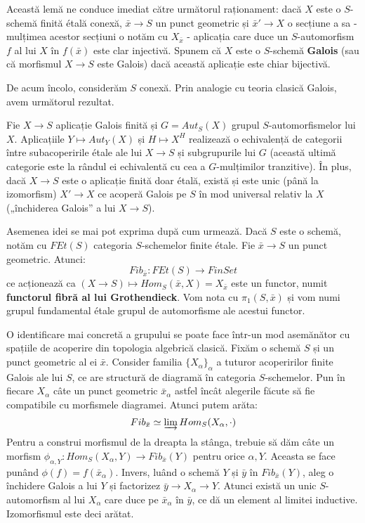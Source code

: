 \documentclass[13pt,openany]{book}
\begin{document}
Această lemă ne conduce imediat către următorul raționament: dacă $X$ este o $S$-schemă finită étală conexă, $\bar{x} \rightarrow S$ un punct geometric și $\bar{x}'\rightarrow X$ o secțiune a sa - mulțimea acestor secțiuni o notăm cu $X_{\bar{x}}$ - aplicația care duce un $S$-automorfism $f$ al lui $X$ în $f(\bar{x})$ este clar injectivă. Spunem că $X$ este o $S$-schemă {\bf Galois} (sau că morfismul $X \rightarrow S$ este Galois) dacă această aplicație este chiar bijectivă.

De acum încolo, considerăm $S$ conexă. Prin analogie cu teoria clasică Galois, avem următorul rezultat.

\begin{prop}
Fie $X \rightarrow S$ aplicație Galois finită și $G=Aut_S(X)$ grupul $S$-automorfismelor lui $X$. Aplicațiile $Y \mapsto Aut_Y(X)$ și $H \mapsto X^H$ realizează o echivalență de categorii între subacoperirile étale ale lui $X \rightarrow S$ și subgrupurile lui $G$ (această ultimă categorie este la rândul ei echivalentă cu cea a $G$-mulțimilor tranzitive). În plus, dacă $X \rightarrow S$ este o aplicație finită doar étală, există și este unic (până la izomorfism) $X' \rightarrow X$ ce acoperă Galois pe $S$ în mod universal relativ la $X$ („închiderea Galois” a lui $X \rightarrow S$).
\end{prop}


Asemenea idei se mai pot exprima după cum urmează. Dacă $S$ este o schemă, notăm cu $FEt(S)$ categoria $S$-schemelor finite étale. Fie $\bar{x} \rightarrow S$ un punct geometric. Atunci:
$$Fib_{\bar{x}} : FEt(S) \rightarrow FinSet$$
ce acționează ca $(X \rightarrow S) \mapsto Hom_S(\bar{x},X)=X_{\bar{x}}$ este un functor, numit {\bf functorul fibră al lui Grothendieck}. Vom nota cu $\pi_1(S,\bar{x})$ și vom numi grupul fundamental étale grupul de automorfisme ale acestui functor.

O identificare mai concretă a grupului se poate face într-un mod asemănător cu spațiile de acoperire din topologia algebrică clasică. Fixăm o schemă $S$ și un punct geometric al ei $\bar{x}$. Consider familia $\{X_\alpha\}_\alpha$ a tuturor acoperirilor finite Galois ale lui $S$, ce are structură de diagramă în categoria $S$-schemelor. Pun în fiecare $X_\alpha$ câte un punct geometric $\bar{x}_\alpha$ astfel încât alegerile făcute să fie compatibile cu morfismele diagramei. Atunci putem arăta:
$$Fib_{\bar{x}} \simeq \varinjlim Hom_S(X_\alpha,\cdot)$$
Pentru a construi morfismul de la dreapta la stânga, trebuie să dăm câte un morfism $\phi_{\alpha,Y} : Hom_S(X_\alpha,Y) \rightarrow Fib_{\bar{x}}(Y)$ pentru orice $\alpha,Y$. Aceasta se face punând $\phi(f)=f(\bar{x}_\alpha)$. Invers, luând o schemă $Y$ și $\bar{y}$ în $Fib_{\bar{x}}(Y)$, aleg o închidere Galois a lui $Y$ și factorizez $\bar{y} \rightarrow X_\alpha \rightarrow Y$. Atunci există un unic $S$-automorfism al lui $X_\alpha$ care duce pe $\bar{x}_\alpha$ în $\bar{y}$, ce dă un element al limitei inductive. Izomorfismul este deci arătat.
\end{document}
